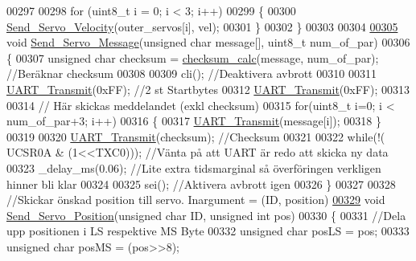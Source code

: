 \begin{DoxyCode}
00297         
00298     \textcolor{keywordflow}{for} (uint8\_t i = 0; i < 3; i++)
00299     \{
00300         \hyperlink{servo___u_a_r_t_8c_ac325c1636bc0a1c5b6cbe967bca0a6d2}{Send\_Servo\_Velocity}(outer\_servos[i], vel);
00301     \}
00302 \}
00303 
00304 
\hypertarget{servo___u_a_r_t_8c_source.tex_l00305}{}\hyperlink{servo___u_a_r_t_8h_a2ed3a2903977a774d1b174665d50661c}{00305} \textcolor{keywordtype}{void} \hyperlink{servo___u_a_r_t_8c_a2ed3a2903977a774d1b174665d50661c}{Send\_Servo\_Message}(\textcolor{keywordtype}{unsigned} \textcolor{keywordtype}{char} message[], uint8\_t num\_of\_par)
00306 \{
00307     \textcolor{keywordtype}{unsigned} \textcolor{keywordtype}{char} checksum = \hyperlink{servo___u_a_r_t_8c_ab388e52c7139a00514d89616ec7da33d}{checksum\_calc}(message, num\_of\_par); \textcolor{comment}{//Beräknar checksum}
00308     
00309     cli(); \textcolor{comment}{//Deaktivera avbrott}
00310     
00311     \hyperlink{servo___u_a_r_t_8c_af34dbb08e8f6cfc1a58d9b7f2b81f455}{UART\_Transmit}(0xFF); \textcolor{comment}{//2 st Startbytes}
00312     \hyperlink{servo___u_a_r_t_8c_af34dbb08e8f6cfc1a58d9b7f2b81f455}{UART\_Transmit}(0xFF);
00313     
00314     \textcolor{comment}{// Här skickas meddelandet (exkl checksum)}
00315     \textcolor{keywordflow}{for}(uint8\_t i=0; i < num\_of\_par+3; i++)
00316     \{
00317         \hyperlink{servo___u_a_r_t_8c_af34dbb08e8f6cfc1a58d9b7f2b81f455}{UART\_Transmit}(message[i]);
00318     \}
00319     
00320     \hyperlink{servo___u_a_r_t_8c_af34dbb08e8f6cfc1a58d9b7f2b81f455}{UART\_Transmit}(checksum); \textcolor{comment}{//Checksum}
00321     
00322     \textcolor{keywordflow}{while}(!( UCSR0A & (1<<TXC0))); \textcolor{comment}{//Vänta på att UART är redo att skicka ny data}
00323     \_delay\_ms(0.06); \textcolor{comment}{//Lite extra tidsmarginal så överföringen verkligen hinner bli klar}
00324     
00325     sei(); \textcolor{comment}{//Aktivera avbrott igen}
00326 \}
00327 
00328 \textcolor{comment}{//Skickar önskad position till servo. Inargument = (ID, position)}
\hypertarget{servo___u_a_r_t_8c_source.tex_l00329}{}\hyperlink{servo___u_a_r_t_8h_a5ed0e49737d1eaf80665c285396b4337}{00329} \textcolor{keywordtype}{void} \hyperlink{servo___u_a_r_t_8c_a5ed0e49737d1eaf80665c285396b4337}{Send\_Servo\_Position}(\textcolor{keywordtype}{unsigned} \textcolor{keywordtype}{char} ID, \textcolor{keywordtype}{unsigned} \textcolor{keywordtype}{int} pos)
00330 \{
00331     \textcolor{comment}{//Dela upp positionen i LS respektive MS Byte}
00332     \textcolor{keywordtype}{unsigned} \textcolor{keywordtype}{char} posLS = pos; 
00333     \textcolor{keywordtype}{unsigned} \textcolor{keywordtype}{char} posMS = (pos>>8);

\end{DoxyCode}
